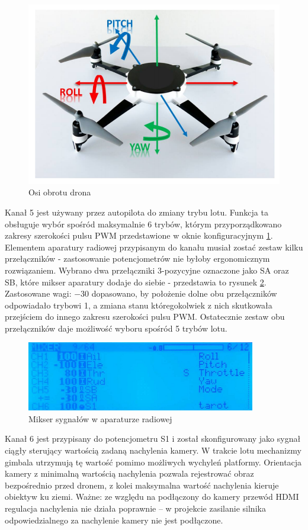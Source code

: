 \begin{figure}[ht]
	\centering
	\includegraphics[width=12cm]{B_rotational_axes.png}
	\caption{Osi obrotu drona \cite{Bouhali2017}}
	\label{fig:flight_modes}
\end{figure}

Kanał 5 jest używany przez autopilota do zmiany trybu lotu. Funkcja ta obsługuje wybór spośród maksymalnie 6 trybów, którym przyporządkowano zakresy szerokości pulsu PWM przedstawione w oknie konfiguracyjnym \ref{fig:flight_modes}. Elementem aparatury radiowej przypisanym do kanału musiał zostać zestaw kilku przełączników - zastosowanie potencjometrów nie byłoby ergonomicznym rozwiązaniem. Wybrano dwa przełączniki 3-pozycyjne oznaczone jako SA oraz SB, które mikser aparatury dodaje do siebie - przedstawia to rysunek \ref{fig:mixer}. Zastosowane wagi: $-30$ dopasowano, by położenie dolne obu przełączników odpowiadało trybowi 1, a zmiana stanu któregokolwiek z nich skutkowała przejściem do innego zakresu szerokości pulsu PWM. Ostatecznie zestaw obu przełączników daje możliwość wyboru spośród 5 trybów lotu.
\begin{figure}[ht]
	\centering
	\includegraphics[width=10cm]{B_mixer.png}
	\caption{Mikser sygnałów w aparaturze radiowej}
	\label{fig:mixer}
\end{figure}

Kanał 6 jest przypisany do potencjometru S1 i został skonfigurowany jako sygnał ciągły sterujący wartością zadaną nachylenia kamery. W trakcie lotu  mechanizmy gimbala utrzymują tę wartość pomimo możliwych wychyleń platformy. Orientacja kamery z minimalną wartością nachylenia pozwala rejestrować obraz bezpośrednio przed dronem, z kolei maksymalna wartość nachylenia kieruje obiektyw ku ziemi.\newline
Ważne: ze względu na podłączony do kamery przewód HDMI regulacja nachylenia nie działa poprawnie -- w projekcie zasilanie silnika odpowiedzialnego za nachylenie kamery nie jest podłączone.

